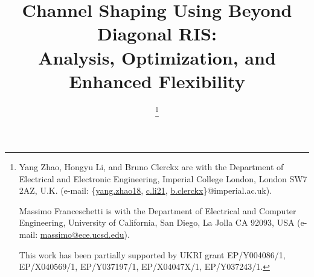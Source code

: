 


\title{Channel Shaping Using Beyond Diagonal RIS:\\Analysis, Optimization, and Enhanced Flexibility}
\author{
	\thanks{
		Yang Zhao, Hongyu Li, and Bruno Clerckx are with the Department of Electrical and Electronic Engineering, Imperial College London, London SW7 2AZ, U.K. (e-mail: \{\href{mailto:yang.zhao18@imperial.ac.uk}{yang.zhao18}, \href{mailto:c.li21@imperial.ac.uk}{c.li21}, \href{mailto:b.clerckx@imperial.ac.uk}{b.clerckx}\}@imperial.ac.uk).

		Massimo Franceschetti is with the Department of Electrical and Computer Engineering, University of California, San Diego, La Jolla CA 92093, USA (e-mail: \href{mailto:massimo@ece.ucsd.edu}{massimo@ece.ucsd.edu}).

		This work has been partially supported by UKRI grant EP/Y004086/1, EP/X040569/1, EP/Y037197/1, EP/X04047X/1, EP/Y037243/1.
	}
}



\maketitle

